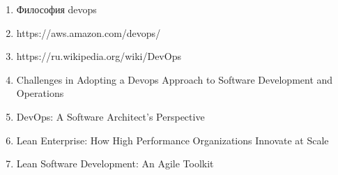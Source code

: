

\begin{enumerate}[{label=\arabic{*}}]

\item Философия devops
    \label{book:Effective Devops}

\item https://aws.amazon.com/devops/
    \label{site:aws.amazon.com/devops}

\item https://ru.wikipedia.org/wiki/DevOps
    \label{site:ru.wikipedia.org/wiki/devops}

\item Challenges in Adopting a Devops Approach to Software Development and Operations
    \label{article:Challenges in Adopting a Devops}

\item DevOps: A Software Architect's Perspective
    \label{book:DevOps: A Software Architect's Perspective}

\item Lean Enterprise: How High Performance Organizations Innovate at Scale
    \label{book:Lean Enterprise}
 
\item Lean Software Development: An Agile Toolkit
    \label{book:Lean Software Development}

\end{enumerate}
